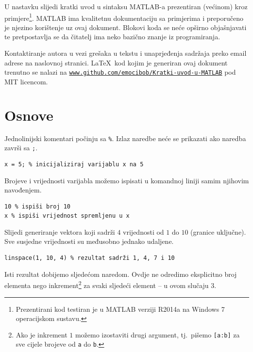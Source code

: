 \documentclass[a4paper, 10pt]{article}
\newcommand{\spec}[1]{\texttt{#1}} %
\begin{document}
U nastavku slijedi kratki uvod u sintaksu MATLAB-a prezentiran (većinom) kroz primjere\footnote{Prezentirani kod testiran je u MATLAB verziji R2014a na Windows 7 operacijskom sustavu.}.
MATLAB ima kvalitetnu dokumentaciju sa primjerima i preporučeno je njezino korištenje uz ovaj dokument.
Blokovi koda se neće opširno objašnjavati te pretpostavlja se da čitatelj ima neko bazično znanje iz programiranja.

Kontaktiranje autora u vezi grešaka u tekstu i unaprjeđenja sadržaja preko email adrese na naslovnoj stranici.
\LaTeX\ kod kojim je generiran ovaj dokument trenutno se nalazi na \texttt{\href{https://github.com/emocibob/Kratki-uvod-u-MATLAB}{www.github.com/emocibob/Kratki-uvod-u-MATLAB}} pod MIT licencom.

\clearpage


\section{Osnove}

Jednolinijski komentari počinju sa \spec{\%}.
Izlaz naredbe neće se prikazati ako naredba završi sa \spec{;}.

\begin{lstlisting}
x = 5; % inicijaliziraj varijablu x na 5
\end{lstlisting}

Brojeve i vrijednosti varijabla možemo ispisati u komandnoj liniji samim njihovim navođenjem.

\begin{lstlisting}
10 % ispiši broj 10
x % ispiši vrijednost spremljenu u x
\end{lstlisting}

Slijedi generiranje vektora koji sadrži $4$ vrijednosti od $1$ do $10$ (granice uključne).
Sve susjedne vrijednosti su međusobno jednako udaljene.

\begin{lstlisting}
linspace(1, 10, 4) % rezultat sadrži 1, 4, 7 i 10
\end{lstlisting}

Isti rezultat dobijemo sljedećom naredom.
Ovdje ne odredimo eksplicitno broj elementa nego inkrement\footnote{Ako je inkrement $1$ možemo izostaviti drugi argument, tj.\ pišemo \spec{[a:b]} za sve cijele brojeve od \spec{a} do \spec{b}.} za svaki sljedeći element -- u ovom slučaju $3$.
\end{document}
